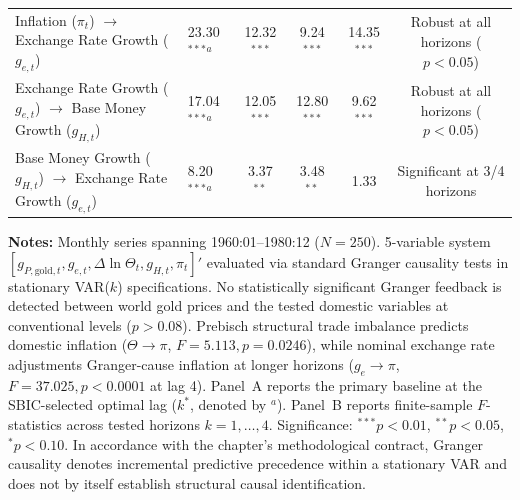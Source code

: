 \begin{table}[htbp]
{\begin{tabular}{llccccc}
Inflation ($\pi_t$) $\to$ Exchange Rate Growth ($g_{e,t}$) & 23.30$^{***}$$^a$ & 12.32$^{***}$ & 9.24$^{***}$ & 14.35$^{***}$ & \multicolumn{2}{c}{Robust at all horizons ($p < 0.05$)} \\
Exchange Rate Growth ($g_{e,t}$) $\to$ Base Money Growth ($g_{H,t}$) & 17.04$^{***}$$^a$ & 12.05$^{***}$ & 12.80$^{***}$ & 9.62$^{***}$ & \multicolumn{2}{c}{Robust at all horizons ($p < 0.05$)} \\
Base Money Growth ($g_{H,t}$) $\to$ Exchange Rate Growth ($g_{e,t}$) & 8.20$^{***}$$^a$ & 3.37$^{**}$ & 3.48$^{**}$ & 1.33 & \multicolumn{2}{c}{Significant at 3/4 horizons} \\
\bottomrule
\end{tabular}%
}
\begin{minipage}{0.96\textwidth}
\vspace{0.3em}
\footnotesize \textbf{Notes:} Monthly series spanning 1960:01--1980:12 ($N=250$). 5-variable system $[g_{P,\text{gold},t}, g_{e,t}, \Delta \ln \Theta_t, g_{H,t}, \pi_t]'$ evaluated via standard Granger causality tests in stationary VAR($k$) specifications. No statistically significant Granger feedback is detected between world gold prices and the tested domestic variables at conventional levels ($p > 0.08$). Prebisch structural trade imbalance predicts domestic inflation ($\Theta \to \pi$, $F = 5.113, p = 0.0246$), while nominal exchange rate adjustments Granger-cause inflation at longer horizons ($g_e \to \pi$, $F = 37.025, p < 0.0001$ at lag 4). Panel~A reports the primary baseline at the SBIC-selected optimal lag ($k^*$, denoted by $^a$). Panel~B reports finite-sample $F$-statistics across tested horizons $k = 1, \dots, 4$. Significance: $^{***} p < 0.01$, $^{**} p < 0.05$, $^{*} p < 0.10$. In accordance with the chapter's methodological contract, Granger causality denotes incremental predictive precedence within a stationary VAR and does not by itself establish structural causal identification.
\end{minipage}
\end{table}
